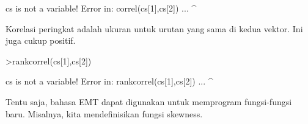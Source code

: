 \documentclass{article}
\begin{document}
\begin{eulernotebook}
\begin{eulercomment}
\begin{eulercomment}
\begin{euleroutput}
  cs is not a variable!
  Error in:
  correl(cs[1],cs[2]) ...
              ^
\end{euleroutput}
\begin{eulercomment}
Korelasi peringkat adalah ukuran untuk urutan yang sama di kedua
vektor. Ini juga cukup positif.
\end{eulercomment}
\begin{eulerprompt}
>rankcorrel(cs[1],cs[2])
\end{eulerprompt}
\begin{euleroutput}
  cs is not a variable!
  Error in:
  rankcorrel(cs[1],cs[2]) ...
                  ^
\end{euleroutput}
\begin{eulercomment}
Tentu saja, bahasa EMT dapat digunakan untuk memprogram fungsi-fungsi
baru. Misalnya, kita mendefinisikan fungsi skewness.


\end{eulercomment}
\end{eulercomment}
\end{eulercomment}
\end{eulernotebook}
\end{document}
